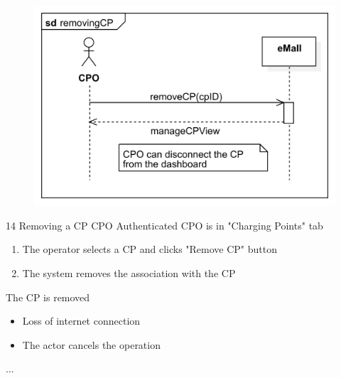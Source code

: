 \usecase
{
    \begin{figure}[H]
        \centering
        \includegraphics[scale=0.9]{src/sequence_diagram/removingCP.png}
    \end{figure}
}
{14}
{Removing a CP} %
{CPO} %
{Authenticated CPO is in "Charging Points" tab} %
{ %
    \begin{enumerate}
        \item The operator selects a CP and clicks "Remove CP" button
        \item The system removes the association with the CP
    \end{enumerate}
}
{The CP is removed} %
{ %
    \begin{itemize}
        \item Loss of internet connection
        \item The actor cancels the operation
    \end{itemize}
}
{ %
    ...
}

